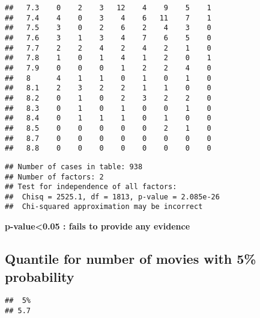 \documentclass[
]{article}
\newenvironment{Shaded}{\begin{snugshade}}{\end{snugshade}}
\newcommand{\FloatTok}[1]{\textcolor[rgb]{0.00,0.00,0.81}{#1}}
\newcommand{\FunctionTok}[1]{\textcolor[rgb]{0.00,0.00,0.00}{#1}}
\newcommand{\NormalTok}[1]{#1}
\newcommand{\SpecialCharTok}[1]{\textcolor[rgb]{0.00,0.00,0.00}{#1}}
\begin{document}
\begin{verbatim}
##   7.3    0    2    3   12    4    9    5    1
##   7.4    4    0    3    4    6   11    7    1
##   7.5    3    0    2    6    2    4    3    0
##   7.6    3    1    3    4    7    6    5    0
##   7.7    2    2    4    2    4    2    1    0
##   7.8    1    0    1    4    1    2    0    1
##   7.9    0    0    0    1    2    2    4    0
##   8      4    1    1    0    1    0    1    0
##   8.1    2    3    2    2    1    1    0    0
##   8.2    0    1    0    2    3    2    2    0
##   8.3    0    1    0    1    0    0    1    0
##   8.4    0    1    1    1    0    1    0    0
##   8.5    0    0    0    0    0    2    1    0
##   8.7    0    0    0    0    0    0    0    0
##   8.8    0    0    0    0    0    0    0    0
\end{verbatim}

\begin{Shaded}
\end{Shaded}

\begin{verbatim}
## Number of cases in table: 938 
## Number of factors: 2 
## Test for independence of all factors:
##  Chisq = 2525.1, df = 1813, p-value = 2.085e-26
##  Chi-squared approximation may be incorrect
\end{verbatim}

\textbf{p-value\textless0.05 : fails to provide any evidence}

\hypertarget{quantile-for-number-of-movies-with-5-probability}{%
\subsection{Quantile for number of movies with 5\%
probability}\label{quantile-for-number-of-movies-with-5-probability}}

\begin{Shaded}
\end{Shaded}

\begin{verbatim}
##  5% 
## 5.7
\end{verbatim}
\end{document}
